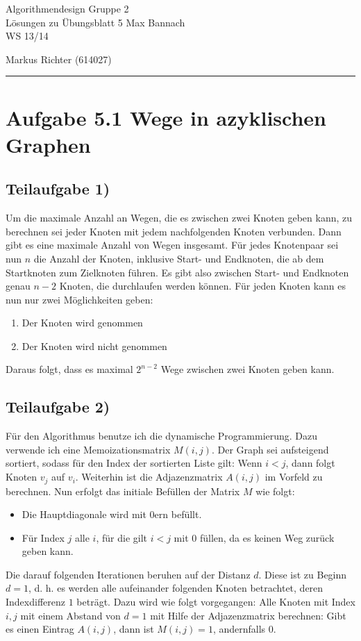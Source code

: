 \documentclass[a4paper, fontsize=10pt]{scrartcl}
\begin{document}
 

{\large Algorithmendesign \hfill Gruppe 2}\\  
{\large Lösungen zu Übungsblatt 5} \hfill Max Bannach\\
{\large WS 13/14}
\begin{flushright}Markus Richter (614027)\end{flushright}
\rule{\textwidth}{.3mm}

\section*{Aufgabe 5.1 Wege in azyklischen Graphen}
\subsection*{Teilaufgabe 1)}
Um die maximale Anzahl an Wegen, die es zwischen zwei Knoten geben kann, zu berechnen sei jeder Knoten mit jedem nachfolgenden Knoten verbunden. Dann gibt es eine maximale Anzahl von Wegen insgesamt. Für jedes Knotenpaar sei nun $n$ die Anzahl der Knoten, inklusive Start- und Endknoten, die ab dem Startknoten zum Zielknoten führen. Es gibt also zwischen Start- und Endknoten genau $n-2$ Knoten, die durchlaufen werden können. Für jeden Knoten kann es nun nur zwei Möglichkeiten geben:

\begin{enumerate}
  \item Der Knoten wird genommen
  \item Der Knoten wird nicht genommen
\end{enumerate}

Daraus folgt, dass es maximal $2^{n-2}$ Wege zwischen zwei Knoten geben kann.


\subsection*{Teilaufgabe 2)}
Für den Algorithmus benutze ich die dynamische Programmierung. Dazu verwende ich eine Memoizationsmatrix $M(i,j)$. Der Graph sei aufsteigend sortiert, sodass für den Index der sortierten Liste gilt: Wenn $i<j$, dann folgt Knoten $v_j$ auf $v_i$. Weiterhin ist die Adjazenzmatrix $A(i,j)$ im Vorfeld zu berechnen. Nun erfolgt das initiale Befüllen der Matrix $M$ wie folgt: 
\begin{itemize}
  \item Die Hauptdiagonale wird mit 0ern befüllt. 
  \item Für Index $j$ alle $i$, für die gilt $i<j$ mit $0$ füllen, da es keinen Weg zurück geben kann.
\end{itemize}
Die darauf folgenden Iterationen beruhen auf der Distanz $d$. Diese ist zu Beginn $d=1$, d. h. es werden alle aufeinander folgenden Knoten betrachtet, deren Indexdifferenz $1$ beträgt. Dazu wird wie folgt vorgegangen:
Alle Knoten mit Index $i,j$ mit einem Abstand von $d=1$ mit Hilfe der Adjazenzmatrix berechnen: Gibt es einen Eintrag $A(i,j)$, dann ist $M(i,j)=1$, andernfalls 0.
\end{document}
